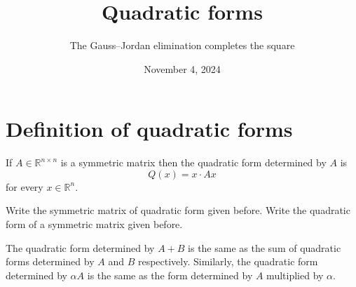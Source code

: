 
\title{Quadratic forms}
\subtitle{The Gauss--Jordan elimination completes the square}
\date[Linear Algebra Fall week 8]{November 4, 2024}

\section{Definition of quadratic forms}
\begin{frame}
    \begin{theorem}
        If $A\in\mathbb{R}^{n\times n}$ is a symmetric matrix then the quadratic form determined by 
        $A$ is
        \[
            Q(x)=x\cdot Ax
        \]
        for every $x\in\mathbb{R}^n.$
    \end{theorem}
    \begin{example}
        Write the symmetric matrix of quadratic form given before.
        Write the quadratic form of a symmetric matrix given before.
    \end{example}
    \begin{theorem}
        The quadratic form determined by $A+B$ is the same as the sum of quadratic forms determined by $A$ and $B$ respectively.
        Similarly,
        the quadratic form determined by $\alpha A$ is the same as the form determined by $A$ multiplied by $\alpha$.
    \end{theorem}
\end{frame}
